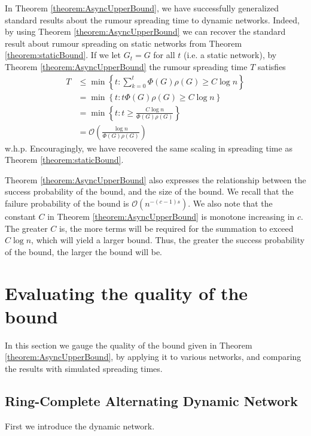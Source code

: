 In Theorem \ref{theorem:AsyncUpperBound}, we have successfully generalized standard results about the rumour spreading time to dynamic networks. Indeed, by using Theorem \ref{theorem:AsyncUpperBound} we can recover the standard result about rumour spreading on static networks from Theorem \ref{theorem:staticBound}. If we let $G_t = G$ for all $t$ (i.e. a static network), by Theorem \ref{theorem:AsyncUpperBound} the rumour spreading time $T$ satisfies 
\begin{align*}
	T &\leq \min \left\{t : \sum_{k=0}^t \Phi(G)\rho(G) \geq C \log n \right\} \\
	&= \min \left\{t : t \Phi(G)\rho(G) \geq C \log n \right\}  \\
	&= \min \left\{t : t \geq \frac{C \log n}{\Phi(G)\rho(G)}\right\}  \\
	&= \mathcal{O}\left(\frac{\log n}{\Phi(G)\rho(G)}\right)
\end{align*}
w.h.p. Encouragingly, we have recovered the same scaling in spreading time as Theorem \ref{theorem:staticBound}.

Theorem \ref{theorem:AsyncUpperBound} also expresses the relationship between the success probability of the bound, and the size of the bound. We recall that the failure probability of the bound is $\mathcal{O}\left(n^{-(c-1)s}\right)$.
We also note that the constant $C$ in Theorem \ref{theorem:AsyncUpperBound} is monotone increasing in $c$. The greater $C$ is, the more terms will be required for the summation to exceed $C \log n$, which will yield a larger bound. 
Thus, the greater the success probability of the bound, the larger the bound will be.
 

\section{Evaluating the quality of the bound}\label{section:asyncEvaluation}

In this section we gauge the quality of the bound given in Theorem \ref{theorem:AsyncUpperBound}, by applying it to various networks, and comparing the results with simulated spreading times.

\subsection{Ring-Complete Alternating Dynamic Network}

First we introduce the dynamic network.

